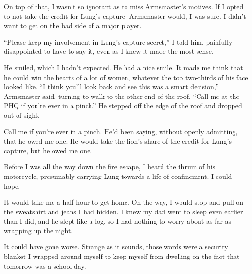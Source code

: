 On top of that, I wasn't so ignorant as to miss Armsmaster's motives.  If I opted to not take the credit for Lung's capture, Armsmaster would, I was sure.  I didn't want to get on the bad side of a major player.



``Please keep my involvement in Lung's capture secret,'' I told him, painfully disappointed to have to say it, even as I knew it made the most sense.



He smiled, which I hadn't expected.  He had a nice smile.  It made me think that he could win the hearts of a lot of women, whatever the top two-thirds of his face looked like.  ``I think you'll look back and see this was a smart decision,'' Armsmaster said, turning to walk to the other end of the roof, ``Call me at the PHQ if you're ever in a pinch.''  He stepped off the edge of the roof and dropped out of sight.



Call me if you're ever in a pinch.  He'd been saying, without openly admitting, that he owed me one.  He would take the lion's share of the credit for Lung's capture, but he owed me one.



Before I was all the way down the fire escape, I heard the thrum of his motorcycle, presumably carrying Lung towards a life of confinement.  I could hope.



It would take me a half hour to get home.  On the way, I would stop and pull on the sweatshirt and jeans I had hidden.  I knew my dad went to sleep even earlier than I did, and he slept like a log, so I had nothing to worry about as far as wrapping up the night.



It could have gone worse.  Strange as it sounds, those words were a  security blanket I wrapped around myself to keep myself from dwelling on the fact that tomorrow was a school day.





